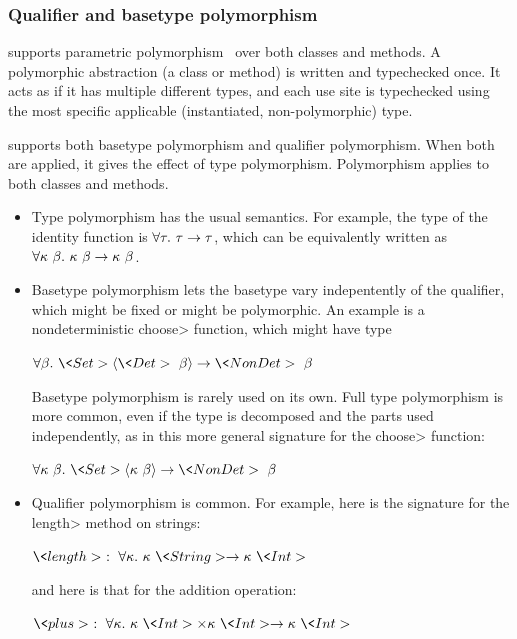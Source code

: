 

\subsubsection{Qualifier and basetype polymorphism}\label{sec:basic-polymorphism}

\OurTypeSystem supports parametric
polymorphism~\cite{Abadi:1989:FIM:77350.77373,Plotkin:1993:LPP:645891.671433}
over both classes and methods.
A polymorphic abstraction (a class or method) is written and
typechecked once.
It acts as if it has multiple different types, and each use site is
typechecked using the most specific applicable (instantiated,
non-polymorphic) type.



\OurTypeSystem supports both basetype polymorphism and qualifier polymorphism.
When both are applied, it gives the effect of type polymorphism.
Polymorphism applies to both classes and methods.

\begin{itemize}
\item
Type polymorphism has the usual semantics.  For example, the type of the
identity function is $\forall \tau . \  \tau \rightarrow \tau$, which can be
equivalently written as
$\forall \kappa \ \beta . \  \kappa \ \beta \rightarrow \kappa \ \beta$.


\item
  Basetype polymorphism lets the basetype vary indepentently of the
  qualifier, which might be fixed or might be polymorphic.
  An example is a nondeterministic \<choose> function, which might have type

  $\forallt{\beta} \<Set>\angles{\<Det>\ \beta} \rightarrow \<NonDet>\ \beta$

  Basetype polymorphism is rarely used on its own.  Full type polymorphism is more
  common, even if the type is decomposed and the parts used independently,
  as in this more general signature for the \<choose> function:

  $\forallt{\kappa\ \beta} \<Set>\angles{\kappa\ \beta} \rightarrow \<NonDet>\ \beta$

\item
Qualifier polymorphism is common.  For example, here is the signature for
the \<length> method on strings:

$\<length>\ :\ \forallt{\kappa} \kappa\ \<String> \rightarrow \kappa\ \<Int>$

\noindent
and here is that for the addition operation:

$\<plus>\ :\ \forallt{\kappa} \kappa\ \<Int> \times \kappa\ \<Int> \rightarrow \kappa\ \<Int>$

\end{itemize}

